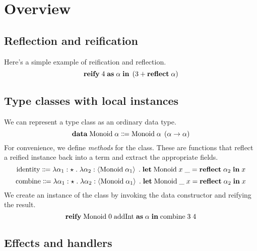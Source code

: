 \section{Overview}

  \subsection{Reflection and reification}

    Here's a simple example of reification and reflection.
    \[ \textbf{reify} \; 4 \; \textbf{as} \; \alpha \; \textbf{in} \; \left( 3 + \textbf{reflect} \; \alpha \right) \]

  \subsection{Type classes with local instances}

    We can represent a type class as an ordinary data type.
    \[ \textbf{data} \; \text{Monoid} \; \alpha \Coloneqq \text{Monoid} \; \alpha \; \left( \alpha \rightarrow \alpha \right) \]
    For convenience, we define \emph{methods} for the class. These are functions that reflect a reified instance back into a term and extract the appropriate fields.
    \[ \text{identity} \Coloneqq \lambda \alpha_1 : \star \; . \; \lambda \alpha_2 : \left\langle \text{Monoid} \; \alpha_1 \right\rangle \; . \; \textbf{let} \; \text{Monoid} \; x \; \_ = \textbf{reflect} \; \alpha_2 \; \textbf{in} \; x \]
    \[ \text{combine} \Coloneqq \lambda \alpha_1 : \star \; . \; \lambda \alpha_2 : \left\langle \text{Monoid} \; \alpha_1 \right\rangle \; . \; \textbf{let} \; \text{Monoid} \; \_ \; x = \textbf{reflect} \; \alpha_2 \; \textbf{in} \; x \]
    We create an instance of the class by invoking the data constructor and reifying the result.
    \[ \textbf{reify} \; \text{Monoid} \; 0 \; \text{addInt} \; \textbf{as} \; \alpha \; \textbf{in} \; \text{combine} \; 3 \; 4 \]

  \subsection{Effects and handlers}
